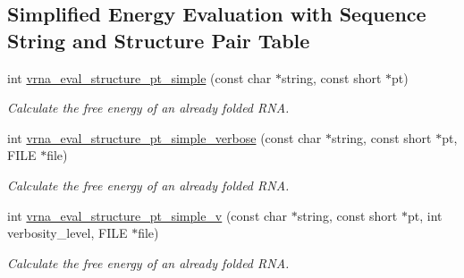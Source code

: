 \subsection*{Simplified Energy Evaluation with Sequence String and Structure Pair Table}
\begin{DoxyCompactItemize}
\item 
int \hyperlink{group__eval_ga0bba59b4d6e53461088666ff4aece7b0}{vrna\+\_\+eval\+\_\+structure\+\_\+pt\+\_\+simple} (const char $\ast$string, const short $\ast$pt)
\begin{DoxyCompactList}\small\item\em Calculate the free energy of an already folded R\+NA. \end{DoxyCompactList}\item 
int \hyperlink{group__eval_ga76e152ee9a02be23da14cdddf52b4e44}{vrna\+\_\+eval\+\_\+structure\+\_\+pt\+\_\+simple\+\_\+verbose} (const char $\ast$string, const short $\ast$pt, F\+I\+LE $\ast$file)
\begin{DoxyCompactList}\small\item\em Calculate the free energy of an already folded R\+NA. \end{DoxyCompactList}\item 
int \hyperlink{group__eval_gac40b813d35289da9816d0c1eec94faa5}{vrna\+\_\+eval\+\_\+structure\+\_\+pt\+\_\+simple\+\_\+v} (const char $\ast$string, const short $\ast$pt, int verbosity\+\_\+level, F\+I\+LE $\ast$file)
\begin{DoxyCompactList}\small\item\em Calculate the free energy of an already folded R\+NA. \end{DoxyCompactList}\end{DoxyCompactItemize}
